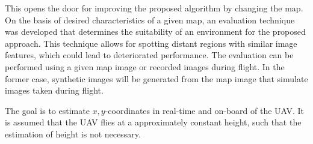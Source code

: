 This opens the door for improving the proposed
algorithm by changing the map. On the basis of desired characteristics
of a given map, an evaluation technique was developed that determines
the suitability of an environment for the proposed approach. This
technique allows for spotting distant regions with similar image
features, which could lead to deteriorated performance. The evaluation
can be performed using a given map image or recorded images during
flight. In the former case, synthetic images will be generated from
the map image that simulate images taken during flight.

The goal is to estimate $x,y$-coordinates in real-time and on-board of the UAV. It is assumed that the UAV flies at a approximately constant height, such that the estimation of height is not necessary.